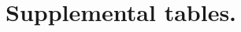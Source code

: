 
\chapter{Supplemental tables.}









\begin{landscape}
\begin{localsize}{6}{7}


\end{localsize}
\end{landscape}


